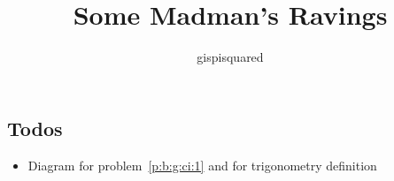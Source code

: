 \documentclass{amsbook}
\title{Some Madman's Ravings}
\author{gispisquared}
\numberwithin{section}{chapter}
\begin{document}
\maketitle
\tableofcontents




\appendix


\subsection*{Todos}
\begin{itemize}
  \item Diagram for problem~\ref{p:b:g:ci:1} and for trigonometry definition
\end{itemize}
\end{document}
